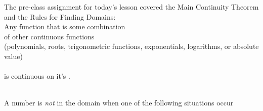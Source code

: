 \documentclass[10pt]{article}
\begin{document}
\newpage
\newpage%


 The pre-class assignment for today's lesson covered the Main Continuity Theorem and the Rules for Finding Domains:
%
{
%
\,\\[-0.05in]
%
Any function that is some combination \\  of other continuous functions\\
 (polynomials, \hfill roots, \hfill   trigonometric functions, \hfill exponentials, logarithms, \hfil or absolute value)\\
  
\\
is continuous on it's .
%
}

 {\bf {}}\\
 A number is {\em not} in the domain when one of the following situations occur
\end{document}
